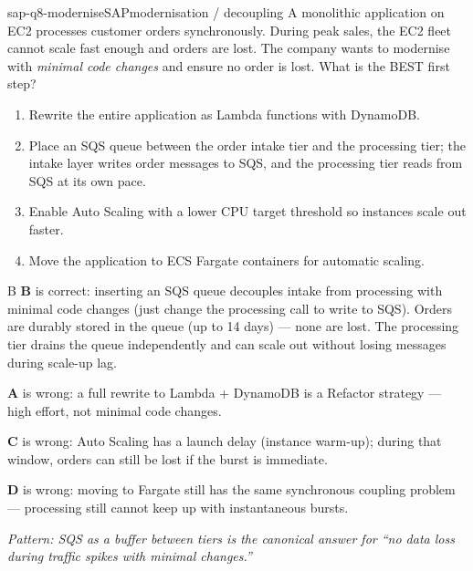 
\begin{question}{sap-q8-modernise}{SAP}{modernisation / decoupling}
A monolithic application on EC2 processes customer orders synchronously. During peak sales, the EC2 fleet cannot scale fast enough and orders are lost. The company wants to modernise with \emph{minimal code changes} and ensure no order is lost. What is the BEST first step?

\begin{enumerate}[label=\Alph*.]
  \item Rewrite the entire application as Lambda functions with DynamoDB.
  \item Place an SQS queue between the order intake tier and the processing tier; the intake layer writes order messages to SQS, and the processing tier reads from SQS at its own pace.
  \item Enable Auto Scaling with a lower CPU target threshold so instances scale out faster.
  \item Move the application to ECS Fargate containers for automatic scaling.
\end{enumerate}
\end{question}

\begin{answer}{B}
\textbf{B} is correct: inserting an SQS queue decouples intake from processing with minimal code changes (just change the processing call to write to SQS). Orders are durably stored in the queue (up to 14 days) --- none are lost. The processing tier drains the queue independently and can scale out without losing messages during scale-up lag.

\textbf{A} is wrong: a full rewrite to Lambda + DynamoDB is a Refactor strategy --- high effort, not minimal code changes.

\textbf{C} is wrong: Auto Scaling has a launch delay (instance warm-up); during that window, orders can still be lost if the burst is immediate.

\textbf{D} is wrong: moving to Fargate still has the same synchronous coupling problem --- processing still cannot keep up with instantaneous bursts.

\textit{Pattern: SQS as a buffer between tiers is the canonical answer for ``no data loss during traffic spikes with minimal changes.''}
\end{answer}


